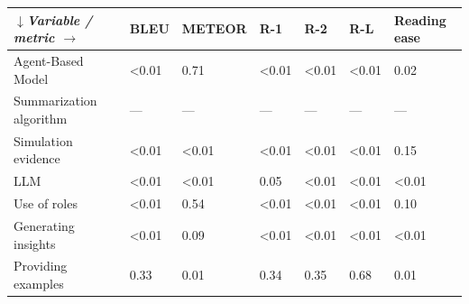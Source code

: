 \begin{tabular}{|l|l|l|l|l|l|l|}
\hline
\textit{$\downarrow$Variable / metric $\rightarrow$} & BLEU & METEOR & R-1 & R-2 & R-L & Reading ease \\
 \hline
 Agent-Based Model & \textless{}0.01 & 0.71 & \textless{}0.01 & \textless{}0.01 & \textless{}0.01 & 0.02 \\
 \hline
 Summarization algorithm & — & — & — & — & — & — \\
 \hline
 Simulation evidence & \textless{}0.01 & \textless{}0.01 & \textless{}0.01 & \textless{}0.01 & \textless{}0.01 & 0.15 \\
 \hline
 LLM & \textless{}0.01 & \textless{}0.01 & 0.05 & \textless{}0.01 & \textless{}0.01 & \textless{}0.01 \\
 \hline
 Use of roles & \textless{}0.01 & 0.54 & \textless{}0.01 & \textless{}0.01 & \textless{}0.01 & 0.10 \\
 \hline
 Generating insights & \textless{}0.01 & 0.09 & \textless{}0.01 & \textless{}0.01 & \textless{}0.01 & \textless{}0.01 \\
 \hline
 Providing examples & 0.33 & 0.01 & 0.34 & 0.35 & 0.68 & 0.01 \\
\hline
\end{tabular}
